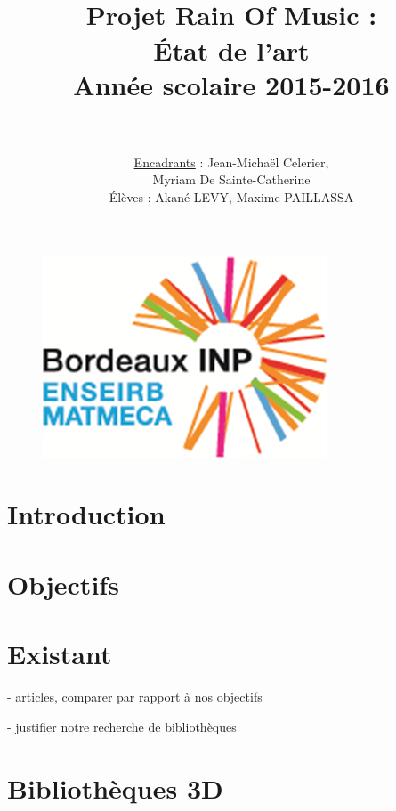 \documentclass[paper=a4,12pt]{article}
\title{
  \horrule{1.5pt} \\[0.5cm]	
  \Huge \textbf{Projet Rain Of Music : \\ État de l'art} \\ [20pt]
    \LARGE Année scolaire 2015-2016 \\ 
  \horrule{1.5pt} \\[0.5cm]
}
\author{						
    \LARGE \underline{Encadrants} : Jean-Michaël Celerier, \\
   					\LARGE	\hspace{5cm} Myriam De Sainte-Catherine\\			
   	\vspace{1cm} 
   	\normalfont
   	\LARGE Élèves :  Akané LEVY, Maxime PAILLASSA    
}
\date{}
\numberwithin{equation}{section}		%
\numberwithin{figure}{section}			%
\numberwithin{table}{section}				%
\begin{document}
\graphicspath{{./imgs/}{.}}
\maketitle

\begin{figure}[H]
  \centering\includegraphics[scale=1.2]{logo_enseirb.png}
\end{figure}

\newpage

\tableofcontents

\newpage
\normalsize

\section{Introduction}


\section{Objectifs}



\section{Existant}





- articles, comparer par rapport à nos objectifs 

- justifier notre recherche de bibliothèques



\section{Bibliothèques 3D}


%
\end{document}
